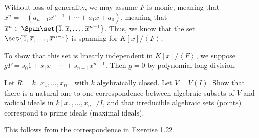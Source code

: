 \documentclass[10pt]{mypackage}
\begin{document}
\begin{solution}
  Without loss of generality, we may assume $F$ is monic, meaning that $x^{n} = -\left( a_{n-1}x^{n-1} + \cdots + a_1x + a_0 \right)$, meaning that $\overline{x}^n \in \Span\set{\overline{1},\overline{x},\dots,\overline{x}^{n-1}}$. Thus, we know that the set $\set{\overline{1},\overline{x},\dots,\overline{x}^{n-1}}$ is spanning for $K\left[ x \right]/\left\langle F \right\rangle$.\newline

  To show that this set is linearly independent in $K\left[ x \right]/\left\langle F \right\rangle$, we suppose $gF = s_0\overline{1} + s_1\overline{x} + \cdots + s_{n-1}\overline{x}^{n-1}$. Then $g = 0$ by polynomial long division.
\end{solution}
\begin{exercise}[Exercise 1.38]
  Let $R = k\left[ x_1,\dots,x_n \right]$ with $k$ algebraically closed. Let $V = V(I)$. Show that there is a natural one-to-one correspondence between algebraic subsets of $V$ and radical ideals in $k\left[ x_1,\dots,x_n \right]/I$, and that irreducible algebraic sets (points) correspond to prime ideals (maximal ideals).
\end{exercise}
\begin{solution}
  This follows from the correspondence in Exercise 1.22.
\end{solution}
\end{document}
